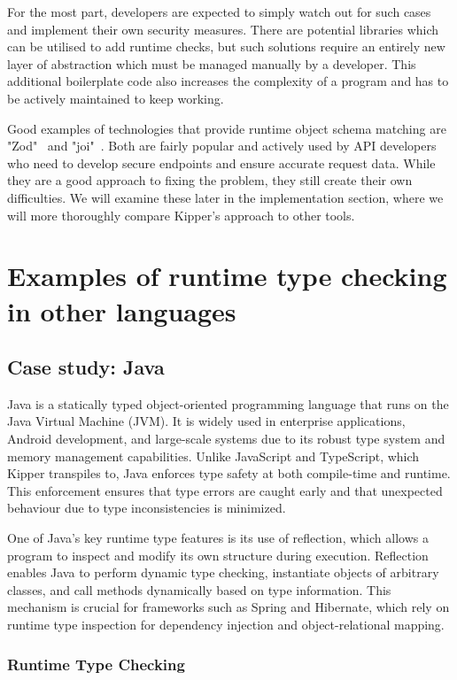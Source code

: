For the most part, developers are expected to simply watch out for such cases and implement their own security measures. There are potential libraries which can be utilised to add runtime checks, but such solutions require an entirely new layer of abstraction which must be managed manually by a developer. This additional boilerplate code also increases the complexity of a program and has to be actively maintained to keep working.

Good examples of technologies that provide runtime object schema matching are "Zod"~\cite{zod} and "joi"~\cite{joi}. Both are fairly popular and actively used by API developers who need to develop secure endpoints and ensure accurate request data. While they are a good approach to fixing the problem, they still create their own difficulties. We will examine these later in the implementation section, where we will more thoroughly compare Kipper's approach to other tools.

\section{Examples of runtime type checking in other languages}

\subsection{Case study: Java}

Java is a statically typed object-oriented programming language that runs on the Java Virtual Machine (JVM). It is widely used in enterprise applications, Android development, and large-scale systems due to its robust type system and memory management capabilities. Unlike JavaScript and TypeScript, which Kipper transpiles to, Java enforces type safety at both compile-time and runtime. This enforcement ensures that type errors are caught early and that unexpected behaviour due to type inconsistencies is minimized.

One of Java’s key runtime type features is its use of 	reflection, which allows a program to inspect and modify its own structure during execution. Reflection enables Java to perform dynamic type checking, instantiate objects of arbitrary classes, and call methods dynamically based on type information. This mechanism is crucial for frameworks such as Spring and Hibernate, which rely on runtime type inspection for dependency injection and object-relational mapping.

\subsubsection{Runtime Type Checking}

